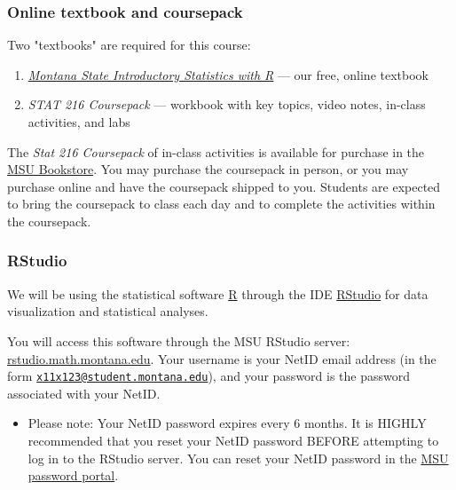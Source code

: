 \documentclass[
]{article}
\providecommand{\tightlist}{%
  \setlength{\itemsep}{0pt}\setlength{\parskip}{0pt}}
\begin{document}
\subsubsection{Online textbook and
coursepack}\label{online-textbook-and-coursepack}

Two "textbooks" are required for this course:

\begin{enumerate}
\def\labelenumi{\arabic{enumi}.}
\tightlist
\item
  \href{https://mtstateintrostats.github.io/IntroStatTextbook/}{\emph{Montana
  State Introductory Statistics with R}} --- our free, online textbook
\item
  \emph{STAT 216 Coursepack} --- workbook with key topics, video notes,
  in-class activities, and labs
\end{enumerate}

The \emph{Stat 216 Coursepack} of in-class activities is available for
purchase in the \href{https://www.msubookstore.org/}{MSU Bookstore}. You
may purchase the coursepack in person, or you may purchase online and
have the coursepack shipped to you. Students are expected to bring the
coursepack to class each day and to complete the activities within the
coursepack.

\subsubsection{RStudio}\label{rstudio}

We will be using the statistical software
\href{https://www.r-project.org/}{R} through the IDE
\href{https://rstudio.com/products/rstudio/}{RStudio} for data
visualization and statistical analyses.

You will access this software through the MSU RStudio server:
\href{https://rstudio.math.montana.edu/}{rstudio.math.montana.edu}. Your
username is your NetID email address (in the form
\href{mailto:x11x123@student.montana.edu}{\nolinkurl{x11x123@student.montana.edu}}),
and your password is the password associated with your NetID.

\begin{itemize}
\tightlist
\item
  Please note: Your NetID password expires every 6 months. It is HIGHLY
  recommended that you reset your NetID password BEFORE attempting to
  log in to the RStudio server. You can reset your NetID password in the
  \href{https://pwreset.montana.edu/react/}{MSU password portal}.
\end{itemize}
\end{document}
